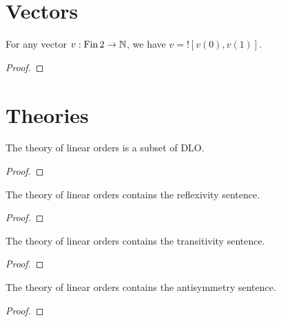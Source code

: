 
\section{Vectors}

\begin{lemma}
    \label{lem:two-vector-notation}
    \leanok
    For any vector $v : \operatorname{Fin} 2 \to \mathbb{N}$, we have $v = ![v(0), v(1)]$.
\end{lemma}
\begin{proof}
    \leanok
\end{proof}

\section{Theories}

\begin{lemma}
    \label{lem:linear-order-theory-in-dlo}
    \leanok
    The theory of linear orders is a subset of DLO.
\end{lemma}
\begin{proof}
    \leanok
\end{proof}

\begin{lemma}
    \label{lem:reflexive-in-linear-order-theory}
    \leanok
    The theory of linear orders contains the reflexivity sentence.
\end{lemma}
\begin{proof}
    \leanok
\end{proof}

\begin{lemma}
    \label{lem:transitive-in-linear-order-theory}
    \leanok
    The theory of linear orders contains the transitivity sentence.
\end{lemma}
\begin{proof}
    \leanok
\end{proof}

\begin{lemma}
    \label{lem:antisymmetric-in-linear-order-theory}
    \leanok
    The theory of linear orders contains the antisymmetry sentence.
\end{lemma}
\begin{proof}
    \leanok
\end{proof}

